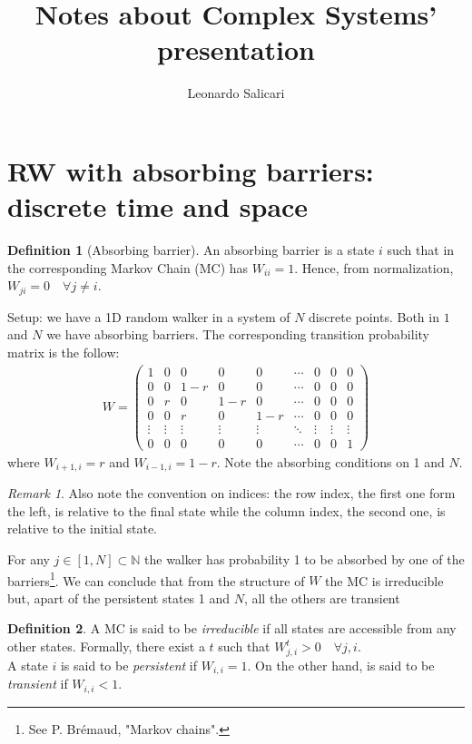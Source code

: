 \documentclass[4apaper,11pt,fleqn]{article}
\title{Notes about Complex Systems' presentation}
\author{Leonardo Salicari}
\theoremstyle{remark}
\newtheorem*{rem}{Remark}
\theoremstyle{definition}
\newtheorem*{dfn}{Definition}
\begin{document}
\maketitle
\tableofcontents


\section{RW with absorbing barriers: discrete time and space}
\begin{dfn}[Absorbing barrier]
  An absorbing barrier is a state $i$ such that in the corresponding Markov Chain (MC) has $W_{ii} = 1$.
  Hence, from normalization, $W_{ji} = 0 \quad \forall  j \neq i$.
\end{dfn}
Setup: we have a 1D random walker in a system of $N$ discrete points. Both in $1$ and $N$ we have absorbing barriers. The corresponding transition probability matrix is the follow:
\begin{align*}
  W = \left( \begin{array}{ccccccccc}{1} & {0} & {0} & {0} & {0} & {\cdots} & {0} & {0} & {0} \\ {0} & {0} & {1-r} & {0} & {0} & {\cdots} & {0} & {0} & {0} \\ {0} & {r} & {0} & {1-r} & {0} & {\cdots} & {0} & {0} & {0} \\ {0} & {0} & {r} & {0} & {1-r} & {\cdots} & {0} & {0} & {0} \\ {\vdots} & {\vdots} & {\vdots} & {\vdots} & {\vdots} & {\ddots} & {\vdots} & {\vdots} & {\vdots} \\ {0} & {0} & {0} & {0} & {0} & {\cdots} & {0} & {0} & {1} \end{array} \right)
\end{align*}
where $ W_{i+1,i} = r $ and $W_{i-1,i} = 1-r$. Note the absorbing conditions on 1 and $N$.
\begin{rem}
  Also note the convention on indices: the row index, the first one form the left, is relative to the final state while the column index, the second one, is relative to the initial state.
\end{rem}
For any $j \in [1,N] \subset \mathbb{N}$ the walker has probability 1 to be absorbed by one of the barriers\footnote{See P. Brémaud, "Markov chains".}. We can conclude that from the structure of $W$ the MC is irreducible but, apart of the persistent states 1 and $N$, all the others are transient
\begin{dfn}
  A MC is said to be \emph{irreducible} if all states are accessible from any other states. Formally, there exist a $t$ such that $W^t_{j,i} > 0 \quad \forall j, i$.\\
  A state $i$ is said to be \emph{persistent} if $W_{i,i}=1$. On the other hand, is said to be \emph{transient} if $W_{i,i}<1$.
\end{dfn}
\end{document}
